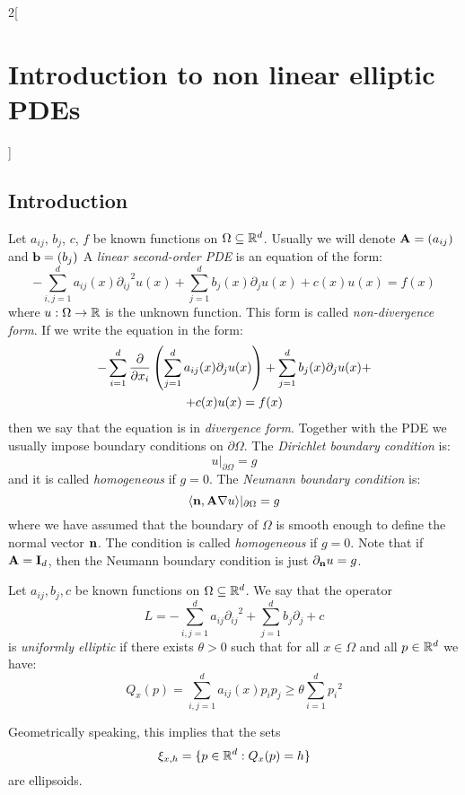 \documentclass[../../../main_math.tex]{subfiles}
\begin{document}
\begin{multicols}{2}[\section{Introduction to non linear elliptic PDEs}]
  \subsection{Introduction}
  \begin{definition}
    Let $a_{ij}$, $b_j$, $c$, $f$ be known functions on $\Omega\subseteq \mathbb{R}^d$. Usually we will denote $\boldsymbol{\mathrm{A}}=(a_{ij})$ and $\boldsymbol{\mathrm{b}}=(b_j)$ A \emph{linear second-order PDE} is an equation of the form:
    \begin{equation*}
      -\sum_{i,j=1}^da_{ij}(x){\partial_{ij}}^2u(x)+\sum_{j=1}^db_j(x)\partial_ju(x)+c(x)u(x)=f(x)
    \end{equation*}
    where $u:\Omega\to \mathbb{R}$ is the unknown function. This form is called \emph{non-divergence form}. If we write the equation in the form:
    \begin{multline*}
      -\sum_{i=1}^d\pdv{}{x_i}\left(\sum_{j=1}^da_{ij}(x)\partial_ju(x)\right)+\sum_{j=1}^db_j(x)\partial_ju(x)+\\+c(x)u(x)=f(x)
    \end{multline*}
    then we say that the equation is in \emph{divergence form}. Together with the PDE we usually impose boundary conditions on $\partial\Omega$. The \emph{Dirichlet boundary condition} is:
    $$
      u|_{\partial\Omega}=g
    $$
    and it is called \emph{homogeneous} if $g=0$. The \emph{Neumann boundary condition} is:
    $$
      \langle \boldsymbol{\mathrm{n}},\boldsymbol{\mathrm{A}} \nabla u\rangle|_{\partial\Omega}=g
    $$
    where we have assumed that the boundary of $\Omega$ is smooth enough to define the normal vector $\boldsymbol{\mathrm{n}}$. The condition is called \emph{homogeneous} if $g=0$. Note that if $\boldsymbol{\mathrm{A}}=\boldsymbol{\mathrm{I}}_d$, then the Neumann boundary condition is just $\partial_{\boldsymbol{\mathrm{n}}} u=g$.
  \end{definition}
  \begin{definition}
    Let $a_{ij},b_j,c$ be known functions on $\Omega\subseteq \mathbb{R}^d$. We say that the operator $$L=-\sum_{i,j=1}^da_{ij}{\partial_{ij}}^2 + \sum_{j=1}^d b_j\partial_j+c$$ is \emph{uniformly elliptic} if there exists $\theta>0$ such that for all $x\in \Omega$ and all $p\in \mathbb{R}^d$ we have:
    \begin{equation}
      Q_x(p)=\sum_{i,j=1}^da_{ij}(x)p_ip_j\geq \theta \sum_{i=1}^{d} {p_i}^2
    \end{equation}
  \end{definition}
  \begin{remark}
    Geometrically speaking, this implies that the sets
    $$
      \xi_{x,h}=\{ p\in \mathbb{R}^d: Q_x(p)=h\}
    $$
    are ellipsoids.
  \end{remark}

\end{multicols}
\end{document}
